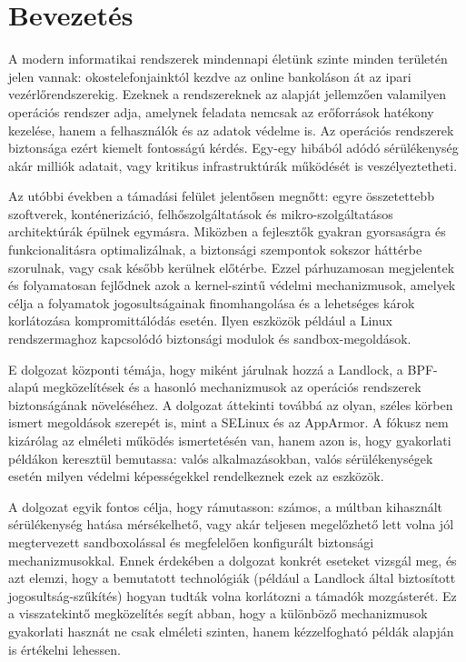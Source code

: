 \chapter{Bevezetés}

A modern informatikai rendszerek mindennapi életünk szinte minden területén jelen vannak: okostelefonjainktól kezdve az online bankoláson át az ipari vezérlőrendszerekig. Ezeknek a rendszereknek az alapját jellemzően valamilyen operációs rendszer adja, amelynek feladata nemcsak az erőforrások hatékony kezelése, hanem a felhasználók és az adatok védelme is. Az operációs rendszerek biztonsága ezért kiemelt fontosságú kérdés. Egy-egy hibából adódó sérülékenység akár milliók adatait, vagy kritikus infrastruktúrák működését is veszélyeztetheti.

Az utóbbi években a támadási felület jelentősen megnőtt: egyre összetettebb szoftverek, konténerizáció, felhőszolgáltatások és mikro-szolgáltatásos architektúrák épülnek egymásra. Miközben a fejlesztők gyakran gyorsaságra és funkcionalitásra optimalizálnak, a biztonsági szempontok sokszor háttérbe szorulnak, vagy csak később kerülnek előtérbe. Ezzel párhuzamosan megjelentek és folyamatosan fejlődnek azok a kernel-szintű védelmi mechanizmusok, amelyek célja a folyamatok jogosultságainak finomhangolása és a lehetséges károk korlátozása kompromittálódás esetén. Ilyen eszközök például a Linux rendszermaghoz kapcsolódó biztonsági modulok és sandbox-megoldások.

E dolgozat központi témája, hogy miként járulnak hozzá a Landlock, a BPF-alapú megközelítések és a hasonló mechanizmusok az operációs rendszerek biztonságának növeléséhez. A dolgozat áttekinti továbbá az olyan, széles körben ismert megoldások szerepét is, mint a SELinux és az AppArmor. A fókusz nem kizárólag az elméleti működés ismertetésén van, hanem azon is, hogy gyakorlati példákon keresztül bemutassa: valós alkalmazásokban, valós sérülékenységek esetén milyen védelmi képességekkel rendelkeznek ezek az eszközök.

A dolgozat egyik fontos célja, hogy rámutasson: számos, a múltban kihasznált sérülékenység hatása mérsékelhető, vagy akár teljesen megelőzhető lett volna jól megtervezett sandboxolással és megfelelően konfigurált biztonsági mechanizmusokkal. Ennek érdekében a dolgozat konkrét eseteket vizsgál meg, és azt elemzi, hogy a bemutatott technológiák (például a Landlock által biztosított jogosultság-szűkítés) hogyan tudták volna korlátozni a támadók mozgásterét. Ez a visszatekintő megközelítés segít abban, hogy a különböző mechanizmusok gyakorlati hasznát ne csak elméleti szinten, hanem kézzelfogható példák alapján is értékelni lehessen.

